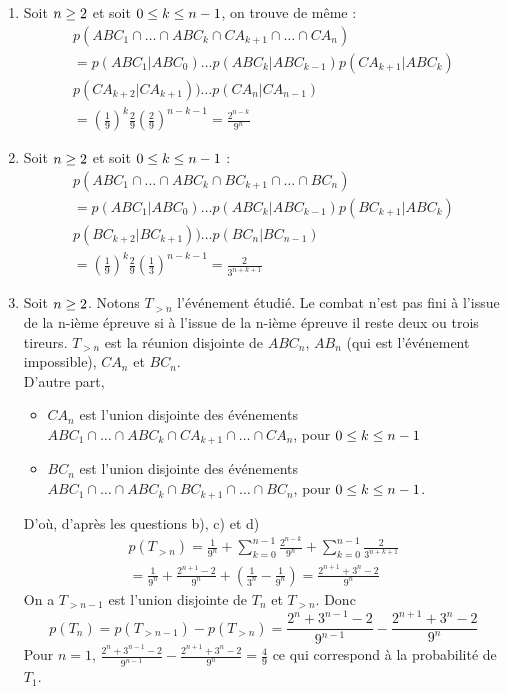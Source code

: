 \begin{enumerate}
\begin{enumerate}
\item Soit $n \geq 2$ et soit $0 \leq k \leq n - 1$, on trouve de même :
\begin{multline*}
p(ABC_1 \cap \dots \cap ABC_k \cap CA_{k+1} \cap \dots \cap CA_n)\\
 = p(ABC_1|ABC_0)\dots p(ABC_{k}|ABC_{k-1})p(CA_{k+1}|ABC_k)\\
  p(CA_{k+2}|CA_{k+1}))\dots p(CA_{n}|CA_{n-1})\\
 = \left(\frac19\right)^k\frac 29 \left(\frac 29\right)^{n-k-1}
 = \frac{2^{n-k}}{9^n}  
\end{multline*}

\item Soit $n \geq 2$ et soit $0 \leq k \leq n - 1$ :
\begin{multline*}
p(ABC_1 \cap \dots \cap ABC_k \cap BC_{k+1} \cap \dots \cap BC_n)\\
 = p(ABC_1|ABC_0)\dots p(ABC_{k}|ABC_{k-1})p(BC_{k+1}|ABC_k)\\
  p(BC_{k+2}|BC_{k+1}))\dots p(BC_{n}|BC_{n-1})\\
 = \left(\frac19\right)^k\frac 29 \left(\frac 13\right)^{n-k-1}
 = \frac{2}{3^{n+k+1}}
\end{multline*}

\item Soit $n \geq 2$. Notons $T_{>n}$ l'événement étudié. Le combat n'est pas fini à l'issue de la n-ième épreuve si à l'issue de la n-ième épreuve il reste deux ou trois tireurs.  $T_{>n}$ est la réunion disjointe de $ABC_n$, $AB_n$ (qui est l'événement impossible), $CA_n$ et $BC_n$.\\
D'autre part,
\begin{itemize}
\item $CA_n$ est l'union disjointe des événements $ABC_1 \cap \dots \cap ABC_k \cap CA_{k+1} \cap \dots \cap CA_n$, pour $0 \leq k \leq n - 1$ 
\item  $BC_n$ est l'union disjointe des événements $ABC_1 \cap \dots \cap ABC_k \cap BC_{k+1} \cap \dots \cap BC_n$, pour $0 \leq k \leq n - 1$.
 \end{itemize} D'où, d'après les questions b), c) et d)  
\begin{multline*}
p(T_{>n}) = \frac1{9^n}+\sum_{k=0}^{n-1}\frac{2^{n-k}}{9^n}+\sum_{k=0}^{n-1}\frac{2}{3^{n+k+1}}\\
 = \frac1{9^n}+\frac{2^{n+1}-2}{9^n}+\left(\frac1{3^n}-\frac1{9^n}\right)
 = \frac{2^{n+1}+3^n-2}{9^n}
\end{multline*}
On a $T_{>n-1}$ est l'union disjointe de $T_n$ et $T_{>n}$. Donc
$$p(T_n)=p(T_{>n-1})-p(T_{>n})=\frac{2^{n}+3^{n-1}-2}{9^{n-1}}-\frac{2^{n+1}+3^n-2}{9^n}$$
Pour $n=1$, $\frac{2^{n}+3^{n-1}-2}{9^{n-1}}-\frac{2^{n+1}+3^n-2}{9^n}=\frac49$ ce qui correspond à la probabilité de $T_1$.


\end{enumerate}
\end{enumerate}
